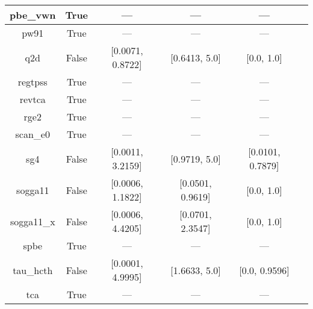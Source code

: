 \begin{tabular}{|c|c|c|c|c|l|}
      pbe\_vwn &                  True &              --- &              --- &              --- & \cite{Kraisler2010_042516,Perdew1996_3865,Perdew1996_3865_err} \\ \hline
          pw91 &                  True &              --- &              --- &              --- &          \cite{Perdew1991,Perdew1992_6671,Perdew1992_6671_err} \\ \hline
           q2d &                 False & [0.0071, 0.8722] &    [0.6413, 5.0] &       [0.0, 1.0] &                                       \cite{Chiodo2012_126402} \\ \hline
       regtpss &                  True &              --- &              --- &              --- &                                       \cite{Perdew2009_026403} \\ \hline
        revtca &                  True &              --- &              --- &              --- &                                        \cite{Tognetti2008_536} \\ \hline
          rge2 &                  True &              --- &              --- &              --- &                                      \cite{Ruzsinszky2009_763} \\ \hline
      scan\_e0 &                  True &              --- &              --- &              --- &                                          \cite{Sun2015_036402} \\ \hline
           sg4 &                 False & [0.0011, 3.2159] &    [0.9719, 5.0] & [0.0101, 0.7879] &                                   \cite{Constantin2016_045126} \\ \hline
       sogga11 &                 False & [0.0006, 1.1822] & [0.0501, 0.9619] &       [0.0, 1.0] &                                       \cite{Peverati2011_1991} \\ \hline
    sogga11\_x &                 False & [0.0006, 4.4205] & [0.0701, 2.3547] &       [0.0, 1.0] &                                     \cite{Peverati2011_191102} \\ \hline
          spbe &                  True &              --- &              --- &              --- &                                        \cite{Swart2009_094103} \\ \hline
     tau\_hcth &                 False & [0.0001, 4.9995] &    [1.6633, 5.0] &    [0.0, 0.9596] &                                          \cite{Boese2002_9559} \\ \hline
           tca &                  True &              --- &              --- &              --- &                                     \cite{Tognetti2008_034101} \\ \hline

\end{tabular}
